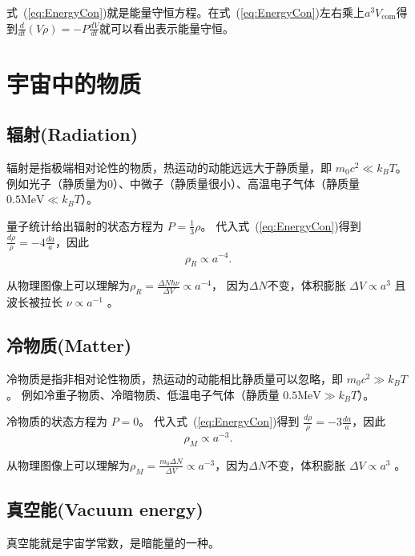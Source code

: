 \documentclass[12pt]{ctexart}
\newcommand{\refeq}[1]{式~(\ref{#1})}
\begin{document}
\refeq{eq:EnergyCon}就是能量守恒方程。在\refeq{eq:EnergyCon}左右乘上$a^3 V_\text{com}$得到$\frac{d}{dt}(V\rho) = -P\frac{dV}{dt}$就可以看出表示能量守恒。

\section{宇宙中的物质}

\subsection{辐射(Radiation)}

辐射是指极端相对论性的物质，热运动的动能远远大于静质量，即 $m_0 c^2 \ll k_B T$。
例如光子（静质量为0）、中微子（静质量很小）、高温电子气体（静质量 $0.5 \mathrm{MeV} \ll k_B T$）。

量子统计给出辐射的状态方程为 $P=\frac{1}{3}\rho$。
代入\refeq{eq:EnergyCon}得到 $\frac{d\rho}{\rho} = -4\frac{da}{a}$，因此 
\begin{equation}
    \rho_R\propto a^{-4}.
\end{equation}

从物理图像上可以理解为$\rho_R = \frac{\Delta N \hbar\nu }{\Delta V}\propto a^{-4}$， 因为$\Delta N$不变，体积膨胀 $\Delta V \propto a^{3}$ 且 波长被拉长 $\nu \propto a^{-1}$ 。

\subsection{冷物质(Matter)}

冷物质是指非相对论性物质，热运动的动能相比静质量可以忽略，即 $m_0 c^2 \gg k_B T$。
例如冷重子物质、冷暗物质、低温电子气体（静质量 $0.5 \mathrm{MeV} \gg k_B T$）。

冷物质的状态方程为 $P=0$。
代入\refeq{eq:EnergyCon}得到 $\frac{d\rho}{\rho} = -3\frac{da}{a}$，因此
\begin{equation}
    \rho_M\propto a^{-3}.
\end{equation} 

从物理图像上可以理解为$\rho_M = \frac{m_0 \Delta N}{\Delta V}\propto a^{-3}$，因为$\Delta N$不变，体积膨胀 $\Delta V \propto a^{3}$ 。

\subsection{真空能(Vacuum energy)}

真空能就是宇宙学常数，是暗能量的一种。
\end{document}
